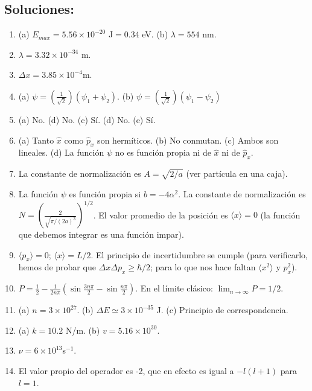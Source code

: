 \documentclass{tufte-handout}
\begin{document}
\subsection{\textbf{Soluciones:}}
\begin{enumerate}
    \item (a) $E_{max}=5.56\times 10^{-20}$ J$=0.34$ eV. (b) $\lambda=554$ nm.
    \item $\lambda=3.32\times 10^{-34}$ m.
    \item $\Delta x=3.85\times 10^{-4}$m.
    \item (a) $\psi=(\frac{1}{\sqrt{2}})(\psi_1+\psi_2)$. (b) $\psi=(\frac{1}{\sqrt{2}})(\psi_1-\psi_2)$
    \item (a) No. (d) No. (c) Sí. (d) No. (e) Sí.
    \item (a) Tanto $\hat{x}$ como $\hat{p}_x$ son hermíticos. (b) No conmutan. (c) Ambos son lineales. (d) La función $\psi$ no es función propia ni de $\hat{x}$ ni de $\hat{p}_x$.
    \item La constante de normalización es $A=\sqrt{2/a}$ (ver partícula en una caja).
    \item La función $\psi$ es función propia si $b=-4\alpha^2$. La constante de normalización es
    $N=(\frac{2}{\sqrt{\pi/(2a)^3}})^{1/2}$. El valor
    promedio de la posición es $\langle x \rangle=0$ (la función que debemos integrar es una función impar).
    \item $\langle p_x\rangle =0$;  $\langle x\rangle =L/2$. El principio de incertidumbre
    se cumple (para verificarlo, hemos de probar que $\Delta x \Delta p_x\geq \hbar/2$; para lo que nos hace faltan $\langle x^2\rangle$ y $p_x^2$).
   \item $P=\frac{1}{2}-\frac{1}{2n\pi}(\sin \frac{3n\pi}{2} - \sin\frac{n\pi}{2})$. En el límite clásico: $\lim_{n\rightarrow \infty}P=1/2$.
   \item (a) $n=3\times 10^{27}$. (b) $\Delta E\simeq 3\times 10^{-35}$ J. (c) Principio de
   correspondencia.
   \item (a) $k=10.2$ N/m. (b) $v=5.16\times 10^{30}$.
  \item $\nu=6\times 10^{13}$s$^{-1}$.   
  \item El valor propio del operador es -2, que en
  efecto es igual a $-l(l+1)$ para $l=1$.
\end{enumerate}
\end{document}
